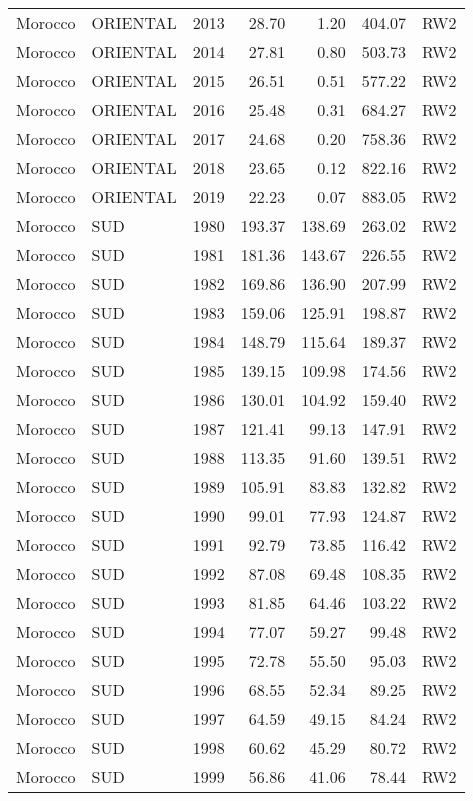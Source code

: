 \begin{longtable}{lllrrrl}
  Morocco & ORIENTAL & 2013 & 28.70 & 1.20 & 404.07 & RW2 \\ 
  Morocco & ORIENTAL & 2014 & 27.81 & 0.80 & 503.73 & RW2 \\ 
  Morocco & ORIENTAL & 2015 & 26.51 & 0.51 & 577.22 & RW2 \\ 
  Morocco & ORIENTAL & 2016 & 25.48 & 0.31 & 684.27 & RW2 \\ 
  Morocco & ORIENTAL & 2017 & 24.68 & 0.20 & 758.36 & RW2 \\ 
  Morocco & ORIENTAL & 2018 & 23.65 & 0.12 & 822.16 & RW2 \\ 
  Morocco & ORIENTAL & 2019 & 22.23 & 0.07 & 883.05 & RW2 \\ 
  Morocco & SUD & 1980 & 193.37 & 138.69 & 263.02 & RW2 \\ 
  Morocco & SUD & 1981 & 181.36 & 143.67 & 226.55 & RW2 \\ 
  Morocco & SUD & 1982 & 169.86 & 136.90 & 207.99 & RW2 \\ 
  Morocco & SUD & 1983 & 159.06 & 125.91 & 198.87 & RW2 \\ 
  Morocco & SUD & 1984 & 148.79 & 115.64 & 189.37 & RW2 \\ 
  Morocco & SUD & 1985 & 139.15 & 109.98 & 174.56 & RW2 \\ 
  Morocco & SUD & 1986 & 130.01 & 104.92 & 159.40 & RW2 \\ 
  Morocco & SUD & 1987 & 121.41 & 99.13 & 147.91 & RW2 \\ 
  Morocco & SUD & 1988 & 113.35 & 91.60 & 139.51 & RW2 \\ 
  Morocco & SUD & 1989 & 105.91 & 83.83 & 132.82 & RW2 \\ 
  Morocco & SUD & 1990 & 99.01 & 77.93 & 124.87 & RW2 \\ 
  Morocco & SUD & 1991 & 92.79 & 73.85 & 116.42 & RW2 \\ 
  Morocco & SUD & 1992 & 87.08 & 69.48 & 108.35 & RW2 \\ 
  Morocco & SUD & 1993 & 81.85 & 64.46 & 103.22 & RW2 \\ 
  Morocco & SUD & 1994 & 77.07 & 59.27 & 99.48 & RW2 \\ 
  Morocco & SUD & 1995 & 72.78 & 55.50 & 95.03 & RW2 \\ 
  Morocco & SUD & 1996 & 68.55 & 52.34 & 89.25 & RW2 \\ 
  Morocco & SUD & 1997 & 64.59 & 49.15 & 84.24 & RW2 \\ 
  Morocco & SUD & 1998 & 60.62 & 45.29 & 80.72 & RW2 \\ 
  Morocco & SUD & 1999 & 56.86 & 41.06 & 78.44 & RW2 \\ 

\end{longtable}
